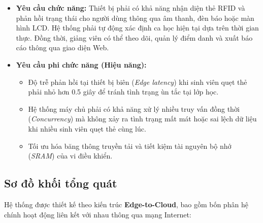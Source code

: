 \documentclass[12pt,a4paper]{report}
\begin{document}
\begin{itemize}

\item \textbf{Yêu cầu chức năng:} 
Thiết bị phải có khả năng nhận diện thẻ RFID và phản hồi trạng thái cho người dùng thông qua âm thanh, đèn báo hoặc màn hình LCD. Hệ thống phải tự động xác định ca học hiện tại dựa trên thời gian thực. Đồng thời, giảng viên có thể theo dõi, quản lý điểm danh và xuất báo cáo thông qua giao diện Web.

\item \textbf{Yêu cầu phi chức năng (Hiệu năng):}

\begin{itemize}

\item Độ trễ phản hồi tại thiết bị biên (\textit{Edge latency}) khi sinh viên quẹt thẻ phải nhỏ hơn 0.5 giây để tránh tình trạng ùn tắc tại lớp học.

\item Hệ thống máy chủ phải có khả năng xử lý nhiều truy vấn đồng thời (\textit{Concurrency}) mà không xảy ra tình trạng mất mát hoặc sai lệch dữ liệu khi nhiều sinh viên quẹt thẻ cùng lúc.

\item Tối ưu hóa băng thông truyền tải và tiết kiệm tài nguyên bộ nhớ (\textit{SRAM}) của vi điều khiển.

\end{itemize}

\end{itemize}

\subsection{Sơ đồ khối tổng quát}

Hệ thống được thiết kế theo kiến trúc \textbf{Edge-to-Cloud}, bao gồm bốn phân hệ chính hoạt động liên kết với nhau thông qua mạng Internet:
\end{document}

